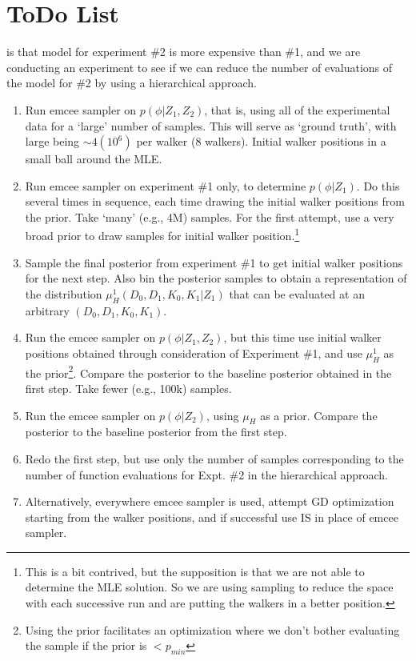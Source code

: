\documentclass{tufte-handout}
\begin{document}
\section{ToDo List}
 is that model for experiment \#2 is more expensive
than \#1, and we are conducting an experiment to see if we can reduce the
number of evaluations of the model for \#2 by using a hierarchical approach.
\begin{enumerate}
    \item Run emcee sampler on $p(\phi|Z_1,Z_2)$, that is, using all of the
        experimental data for a `large' number of samples. This will serve as
        `ground truth', with large being $\sim 4(10^6)$ per walker (8 walkers).
        Initial walker positions in a small ball around the MLE.
    \item Run emcee sampler on experiment \#1 only, to determine $p(\phi|Z_1)$.
        Do this several times in sequence, each time drawing the initial walker
        positions from the prior. Take `many' (e.g., 4M) samples. For the first
        attempt, use a very broad prior to draw samples for initial walker
        position.\footnote{This is a bit contrived, but the supposition is that
        we are not able to determine the MLE solution. So we are using sampling
    to reduce the space with each successive run and are putting the walkers in
a better position.}
    \item Sample the final posterior from experiment \#1 to get initial walker
        positions for the next step. Also bin the posterior samples to obtain a
        representation of the distribution $\mu_{H}^1(D_0,D_1,K_0,K_1|Z_1)$
        that can be evaluated at an arbitrary $(D_0,D_1,K_0,K_1)$.
    \item Run the emcee sampler on $p(\phi|Z_1,Z_2)$, but this time use initial
        walker positions obtained through consideration of Experiment \#1, and
        use $\mu_H^1$ as the prior\footnote{Using the prior facilitates an
        optimization where we don't bother evaluating the sample if the prior
    is $< p_{min}$}. Compare the posterior to the baseline
        posterior obtained in the first step.  Take fewer (e.g., 100k) samples. 
    \item Run the emcee sampler on $p(\phi|Z_2)$, using $\mu_H$ as a prior.
        Compare the posterior to the baseline posterior from the first step.
    \item Redo the first step, but use only the number of samples corresponding
        to the number of function evaluations for Expt. \#2 in the hierarchical
        approach.
    \item Alternatively, everywhere emcee sampler is used, attempt GD
        optimization starting from the walker positions, and if successful use
        IS in place of emcee sampler. 
\end{enumerate}
\end{document}
